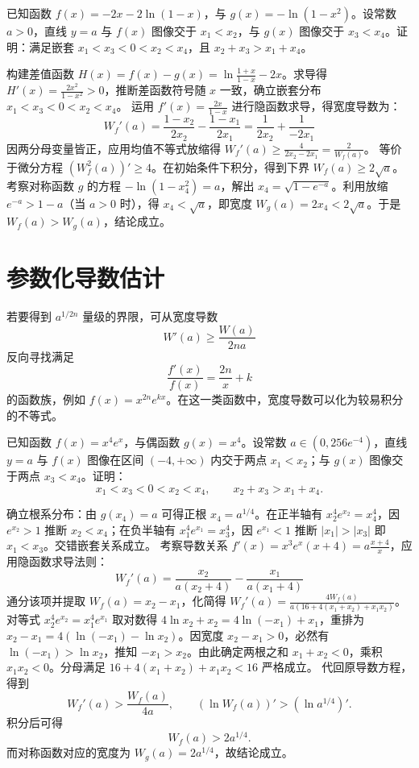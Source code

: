 \begin{example}
已知函数 $f(x) = -2x - 2\ln(1-x)$，与 $g(x) = -\ln(1-x^2)$。设常数 $a > 0$，直线 $y=a$ 与 $f(x)$ 图像交于 $x_1 < x_2$，与 $g(x)$ 图像交于 $x_3 < x_4$。证明：满足嵌套 $x_1 < x_3 < 0 < x_2 < x_4$，且 $x_2 + x_3 > x_1 + x_4$。
\end{example}

\begin{solution}
构建差值函数 $H(x) = f(x) - g(x) = \ln\frac{1+x}{1-x} - 2x$。求导得 $H'(x) = \frac{2x^2}{1-x^2} > 0$，推断差函数符号随 $x$ 一致，确立嵌套分布 $x_1 < x_3 < 0 < x_2 < x_4$。
运用 $f'(x) = \frac{2x}{1-x}$ 进行隐函数求导，得宽度导数为：
$$ W_f'(a) = \frac{1-x_2}{2x_2} - \frac{1-x_1}{2x_1} = \frac{1}{2x_2} + \frac{1}{-2x_1} $$
因两分母变量皆正，应用均值不等式放缩得 $W_f'(a) \ge \frac{4}{2x_2 - 2x_1} = \frac{2}{W_f(a)}$。
等价于微分方程 $(W_f^2(a))' \ge 4$。在初始条件下积分，得到下界 $W_f(a) \ge 2\sqrt{a}$。
考察对称函数 $g$ 的方程 $-\ln(1-x_4^2) = a$，解出 $x_4 = \sqrt{1-e^{-a}}$。利用放缩 $e^{-a} > 1-a$（当 $a>0$ 时），得 $x_4 < \sqrt{a}$，即宽度 $W_g(a) = 2x_4 < 2\sqrt{a}$。于是 $W_f(a) > W_g(a)$，结论成立。
\end{solution}

\section{参数化导数估计}

若要得到 \(a^{1/2n}\) 量级的界限，可从宽度导数
\[
W'(a) \ge \frac{W(a)}{2na}
\]
反向寻找满足
\[
\frac{f'(x)}{f(x)} = \frac{2n}{x} + k
\]
的函数族，例如 \(f(x)=x^{2n}e^{kx}\)。在这一类函数中，宽度导数可以化为较易积分的不等式。

\begin{example}
已知函数 $f(x) = x^4 e^x$，与偶函数 $g(x) = x^4$。设常数 $a \in (0, 256e^{-4})$，直线 $y=a$ 与 $f(x)$ 图像在区间 $(-4, +\infty)$ 内交于两点 $x_1 < x_2$；与 $g(x)$ 图像交于两点 $x_3 < x_4$。证明：
\[
x_1 < x_3 < 0 < x_2 < x_4,
\qquad
x_2 + x_3 > x_1 + x_4.
\]
\end{example}

\begin{solution}
确立根系分布：由 $g(x_4) = a$ 可得正根 $x_4 = a^{1/4}$。在正半轴有 $x_2^4 e^{x_2} = x_4^4$，因 $e^{x_2} > 1$ 推断 $x_2 < x_4$；在负半轴有 $x_1^4 e^{x_1} = x_3^4$，因 $e^{x_1} < 1$ 推断 $|x_1| > |x_3|$ 即 $x_1 < x_3$。交错嵌套关系成立。
考察导数关系 $f'(x) = x^3 e^x (x+4) = a\frac{x+4}{x}$，应用隐函数求导法则：
$$ W_f'(a) = \frac{x_2}{a(x_2+4)} - \frac{x_1}{a(x_1+4)} $$
通分该项并提取 $W_f(a) = x_2 - x_1$，化简得 $W_f'(a) = \frac{4W_f(a)}{a(16 + 4(x_1+x_2) + x_1 x_2)}$。
对等式 $x_2^4 e^{x_2} = x_1^4 e^{x_1}$ 取对数得 $4\ln x_2 + x_2 = 4\ln(-x_1) + x_1$，重排为 $x_2 - x_1 = 4(\ln(-x_1) - \ln x_2)$。因宽度 $x_2 - x_1 > 0$，必然有 $\ln(-x_1) > \ln x_2$，推知 $-x_1 > x_2$。由此确定两根之和 $x_1 + x_2 < 0$，乘积 $x_1 x_2 < 0$。分母满足 $16 + 4(x_1+x_2) + x_1 x_2 < 16$ 严格成立。
代回原导数方程，得到
\[
W_f'(a) > \frac{W_f(a)}{4a},
\qquad
\left(\ln W_f(a)\right)' > \left(\ln a^{1/4}\right)'.
\]
积分后可得
\[
W_f(a) > 2a^{1/4}.
\]
而对称函数对应的宽度为 $W_g(a) = 2a^{1/4}$，故结论成立。
\end{solution}

